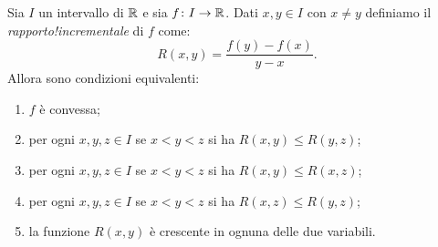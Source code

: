 \begin{lemma}
\mymark{*}%
\label{lemma:547091}%
Sia $I$ un intervallo di $\mathbb R$ e sia $f\colon I\to \mathbb R$.
Dati $x,y\in I$ con $x\neq y$ definiamo il \emph{rapporto!incrementale}
di $f$ come:
\[
  R(x,y) = \frac{f(y) - f(x)}{y-x}.
\]
Allora sono condizioni equivalenti:
\begin{enumerate}
\item $f$ è convessa;
\item per ogni $x,y,z\in I$ se $x<y<z$ si ha $R(x,y)\le R(y,z)$;
\item per ogni $x,y,z\in I$ se $x<y<z$ si ha $R(x,y)\le R(x,z)$;
\item per ogni $x,y,z\in I$ se $x<y<z$ si ha $R(x,z)\le R(y,z)$;
\item la funzione $R(x,y)$ è crescente in ognuna delle due variabili.
\end{enumerate}
\end{lemma}
%
